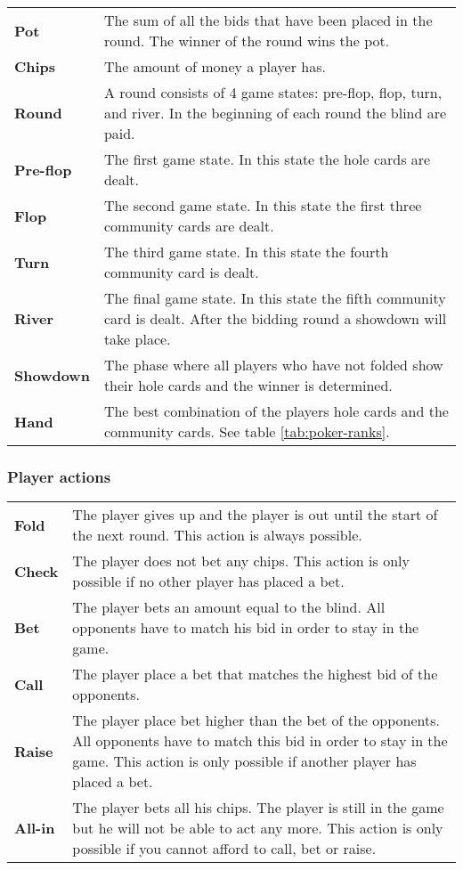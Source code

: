 \begin{tabular}{ p{0.18\linewidth} p{0.82\linewidth} }
\textbf{Pot} & The sum of all the bids that have been placed in the round. The winner of the round wins the pot.\\
\textbf{Chips} & The amount of money a player has.\\
\textbf{Round} & A round consists of 4 game states: pre-flop, flop, turn, and river. In the beginning of each round the blind are paid.\\
\textbf{Pre-flop} & The first game state. In this state the hole cards are dealt.\\
\textbf{Flop} & The second game state. In this state the first three community cards are dealt.\\
\textbf{Turn} & The third game state. In this state the fourth community card is dealt.\\
\textbf{River} & The final game state. In this state the fifth community card is dealt. After the bidding round a showdown will take place.\\
\textbf{Showdown} & The phase where all players who have not folded show their hole cards and the winner is determined.\\
\textbf{Hand} & The best combination of the players hole cards and the community cards. See table \ref{tab:poker-ranks}.
\end{tabular}

\subsubsection*{Player actions}
\begin{tabular}{ p{0.1\linewidth} p{0.9\linewidth} }
  \textbf{Fold} & The player gives up and the player is out until the start of the next round. This action is always possible.\\
  \textbf{Check} & The player does not bet any chips. This action is only possible if no other player has placed a bet.\\
  \textbf{Bet} & The player bets an amount equal to the blind. All opponents have to match his bid in order to stay in the game.\\
  \textbf{Call} & The player place a bet that matches the highest bid of the opponents.\\
  \textbf{Raise} & The player place bet higher than the bet of the opponents. All opponents have to match this bid in order to stay in the game. This action is only possible if another player has placed a bet.\\
  \textbf{All-in} & The player bets all his chips. The player is still in the game but he will not be able to act any more. This action is only possible if you cannot afford to call, bet or raise.\\
\end{tabular}
